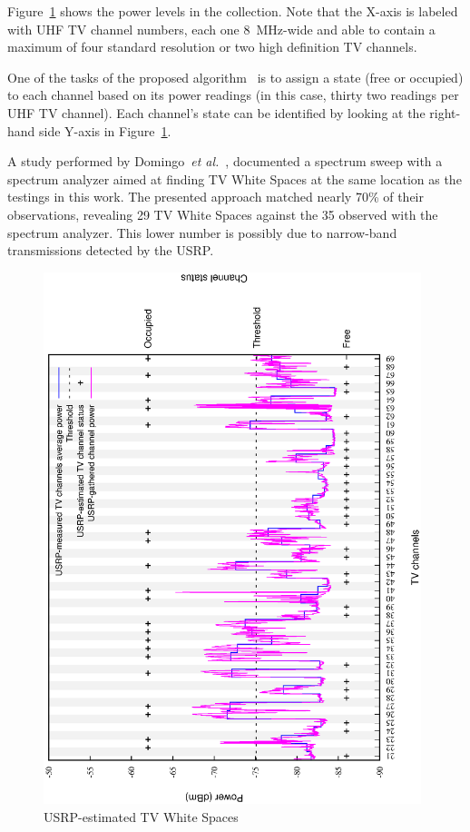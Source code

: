 Figure~\ref{fig:tvChannels} shows the power levels in the collection. Note that the X-axis is labeled with UHF TV channel numbers, each one $8$~MHz-wide and able to contain a maximum of four standard resolution or two high definition TV channels.

One of the tasks of the proposed algorithm~\cite{sanabriaCodeUSRP} is to assign a state (free or occupied) to each channel based on its power readings (in this case, thirty two readings per UHF TV channel). Each channel's state can be identified by looking at the right-hand side Y-axis in Figure~\ref{fig:tvChannels}.

A study performed by Domingo~\emph{et al.}~\cite{domingo2012white}, documented a spectrum sweep with a spectrum analyzer aimed at finding TV White Spaces at the same location as the testings in this work. The presented approach matched nearly 70\% of their observations, revealing 29 TV White Spaces against the 35 observed with the spectrum analyzer. This lower number is possibly due to narrow-band transmissions detected by the USRP.

\begin{figure}[htbp]
  \centering
  \includegraphics[width = 11cm, angle = -90]{sect3/figures/figure1_MACOM.eps}
  \caption{USRP-estimated TV White Spaces}
  \label{fig:tvChannels}
\end{figure}
